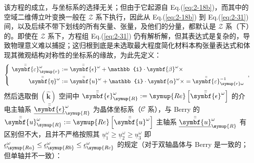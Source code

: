 该方程的成立，与坐标系的选择无关；但由于它起源自 Eq.(\ref{eq:2-18b})，而其中的空域二维傅立叶变换一般在 $\mathcal{Z}$ 系下执行，因此从 Eq.(\ref{eq:2-18b}) 到 Eq.(\ref{eq:2-31}) 间，以及后续不带下划线的所有矢量、张量，及他们的分量，都默认是 $\mathcal{Z}$ 系（下）的。即使在 $\mathcal{Z}$ 系下，方程组 Eq.(\ref{eq:2-31}) 仍有解析解，但其表达式是复杂的，导致物理意义难以捕捉；这归根到底是未选取最大程度简化材料本构张量表达式和体现其微观结构对称性的坐标系的缘故，为此先定义：
\begin{equation} \label{eq:2-32}
	\left\{\ \begin{aligned} \bar{\bar{\symbf{\varepsilon}}}_{\symup{r}}^{\omega} &:= \bar{\bar{\symbf{\epsilon}}}^{\omega} + \mathbb{i} \cdot {\symbf {\beta}^\omega} \times \\ \bar{\bar{\symbf{\eta}}}^\omega &:= \bar{\bar{\symbf{u}}}^\omega + \mathbb{i} \cdot {\symbf {\alpha}^\omega} \times = \bar{\bar{\symbf{\varepsilon}}}^{-1}_{\symup{r}\omega} \end{aligned}\right. ~,
\end{equation}
然后选取倒 $\left( \hat{\symbf k} \right)$ 空间中 $\bar{\bar{\symbf{\epsilon}}}_{\symup{R}}^{\omega} := \symup{Re} \left[ \bar{\bar{\symbf{\epsilon}}}^{\omega} \right]$ 的介电主轴系 $\bar{\bar{\underline{\symbf{\epsilon}}}}_{\symup{R}}^{\omega}$ 为晶体坐标系（$\mathcal{C}$ 系），与 Berry 的 $\bar{\bar{\symbf{u}}}_{\symup{R}}^{\omega} := \symup{Re} \left[ \bar{\bar{\symbf{u}}}^{\omega} \right]$ 主轴系 $\bar{\bar{\underline{\symbf{u}}}}_{\symup{R}}^{\omega}$ 有区别但不大，且并不严格按照其 $\underline{u}_1^\omega \geq \underline{u}_2^\omega \geq \underline{u}_3^\omega$ 即 $\underline{\epsilon}_{\symup{Ra}}^\omega \leq \underline{\epsilon}_{\symup{Rb}}^\omega \leq \underline{\epsilon}_{\symup{Rc}}^\omega$ 的规定（对于双轴晶体与 Berry 是一致的；但单轴并不一致）：
